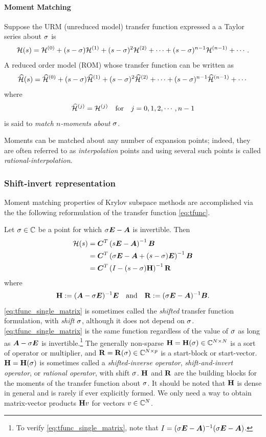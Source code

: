\paragraph{Moment Matching}
 Suppose the URM (unreduced model) transfer function expressed a a Taylor series about $\sigma$ is 
\[
\mathcal{H}(s) = \mathcal{H}^{(0)} + (s-\sigma)\mathcal{H}^{(1)} + (s-\sigma)^2 \mathcal{H}^{(2)} + \cdots +(s-\sigma)^{n-1} \mathcal{H}^{({n-1})} + \cdots.
\]
A reduced order model (ROM) whose transfer function can be written as 
\[
\widehat{\mathcal{H}}(s) = \widehat{\mathcal{H}}^{(0)}  + (s-\sigma)\widehat{\mathcal{H}}^{(1)} + (s-\sigma)^2 \widehat{\mathcal{H}}^{(2)} + \cdots +(s-\sigma)^{n-1} \widehat{\mathcal{H}}^{(n-1)} + \cdots
\]
where 
\[
\widehat{\mathcal{H}}^{(j)} = \mathcal{H}^{(j)} \quad\text{for}\quad j=0,1,2,\cdots,n-1
\]
  is said to \emph{match $n$-moments about $\sigma$}.  

Moments can be matched about any number of expansion points; indeed, they are often referred to as \emph{interpolation} points and using several such points is called \emph{rational-interpolation}. 

\subsubsection{Shift-invert representation}
Moment matching properties of Krylov subspace methods are accomplished via the the following reformulation of the transfer function \eqref{eq:tfunc}.

 Let $\sigma\in\mathbb{C}$ be a point for which $\sigma \bm{E}-\bm{A}$ is invertible. Then
        \begin{align}
                        \mathcal{H}(s) &= \bm{C}^T\left(s\bm{E}-\bm{A}\right)^{-1}\bm{B}\nonumber\\
					&= \bm{C}^T\left(\sigma \bm{E} - \bm{A} + (s-\sigma)\bm{E}\right)^{-1}\bm{B}\nonumber\\
                                &= \bm{C}^T\left(I-(s-\sigma)\textbf{\textup{H}}\right)^{-1}\textbf{\textup{R}} 
        \label{eq:tfunc_single_matrix}
        \end{align}
        where
        \begin{equation}
                        \textbf{\textup{H}} := (\bm{A} - \sigma \bm{E})^{-1}\bm{E}\quad\textrm{and}\quad \textbf{\textup{R}} := (\sigma \bm{E}-\bm{A})^{-1}\bm{B}.        
        \label{eq:singlematrixdefs}
        \end{equation}
  \eqref{eq:tfunc_single_matrix} is sometimes called the \emph{shifted} transfer function formulation, with \emph{shift} $\sigma$, although it does not depend on $\sigma$.  \eqref{eq:tfunc_single_matrix} is the same function regardless of the value of $\sigma$ as long as $\bm{A}-\sigma \bm{E}$ is invertible.\footnote{To verify \eqref{eq:tfunc_single_matrix}, note that $I=(\sigma \bm{E} - \bm{A})^{-1}(\sigma \bm{E} - \bm{A})$.}  The generally non-sparse $\textbf{\textup{H}} = \textbf{\textup{H}}(\sigma)\in\mathbb{C}^{N\times N}$ is a sort of operator or multiplier, and $\textbf{\textup{R}}=\textbf{\textup{R}}(\sigma)\in\mathbb{C}^{N \times p}$ is a start-block or start-vector.  $\textbf{\textup{H}}=\textbf{\textup{H}}(\sigma)$ is sometimes called a \emph{shifted-inverse operator}, \emph{shift-and-invert operator}, or \emph{rational operator}, with shift $\sigma$.   $\textbf{\textup{H}}$ and $\textbf{\textup{R}}$ are the building blocks for the moments of the transfer function about $\sigma$.  It should be noted that $\textbf{\textup{H}}$ is dense in general and is rarely if ever explicitly formed.  We only need a way to obtain matrix-vector products $\textbf{\textup{H}} v$ for vectors $v\in\mathbb{C}^N$. 

